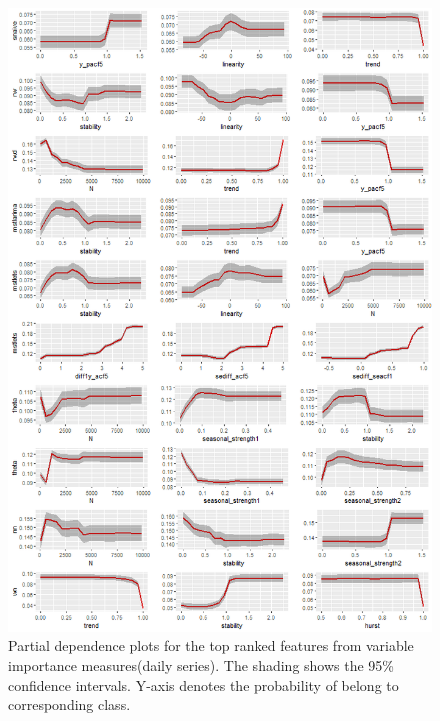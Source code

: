 \documentclass[11pt,a4paper,]{article}
\theoremstyle{definition}
\theoremstyle{definition}
\theoremstyle{definition}
\theoremstyle{remark}
\begin{document}
\begin{figure}
\centering
\includegraphics{figures/dailypdp-1.png}
\caption{\label{fig:dailypdp}Partial dependence plots for the top ranked
features from variable importance measures(daily series). The shading
shows the 95\% confidence intervals. Y-axis denotes the probability of
belong to corresponding class.}
\end{figure}

\newpage
\end{document}
